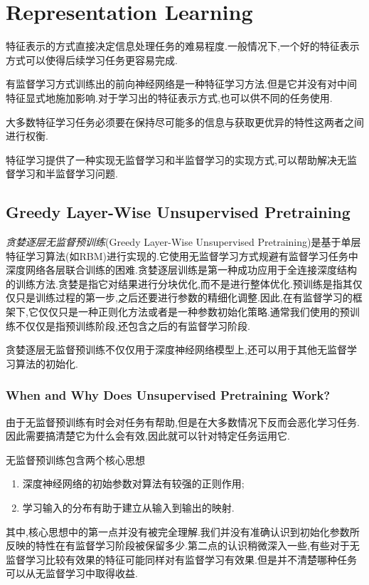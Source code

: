 \chapter{Representation Learning}

特征表示的方式直接决定信息处理任务的难易程度.一般情况下,一个好的特征表示方式可以使得后续学习任务更容易完成.

有监督学习方式训练出的前向神经网络是一种特征学习方法.但是它并没有对中间特征显式地施加影响.对于学习出的特征表示方式,也可以供不同的任务使用.

大多数特征学习任务必须要在保持尽可能多的信息与获取更优异的特性这两者之间进行权衡.

特征学习提供了一种实现无监督学习和半监督学习的实现方式,可以帮助解决无监督学习和半监督学习问题.

\section{Greedy Layer-Wise Unsupervised Pretraining}

\textit{贪婪逐层无监督预训练}(Greedy Layer-Wise Unsupervised Pretraining)是基于单层特征学习算法(如RBM)进行实现的.它使用无监督学习方式规避有监督学习任务中深度网络各层联合训练的困难.贪婪逐层训练是第一种成功应用于全连接深度结构的训练方法.贪婪是指它对结果进行分块优化,而不是进行整体优化.预训练是指其仅仅只是训练过程的第一步,之后还要进行参数的精细化调整.因此,在有监督学习的框架下,它仅仅只是一种正则化方法或者是一种参数初始化策略.通常我们使用的预训练不仅仅是指预训练阶段,还包含之后的有监督学习阶段.

贪婪逐层无监督预训练不仅仅用于深度神经网络模型上,还可以用于其他无监督学习算法的初始化.

\subsection{When and Why Does Unsupervised Pretraining Work?}

由于无监督预训练有时会对任务有帮助,但是在大多数情况下反而会恶化学习任务.因此需要搞清楚它为什么会有效,因此就可以针对特定任务运用它.

无监督预训练包含两个核心思想
\begin{enumerate}
    \item 深度神经网络的初始参数对算法有较强的正则作用;
    \item 学习输入的分布有助于建立从输入到输出的映射.
\end{enumerate}
其中,核心思想中的第一点并没有被完全理解.我们并没有准确认识到初始化参数所反映的特性在有监督学习阶段被保留多少.第二点的认识稍微深入一些,有些对于无监督学习比较有效果的特征可能同样对有监督学习有效果.但是并不清楚哪种任务可以从无监督学习中取得收益.

